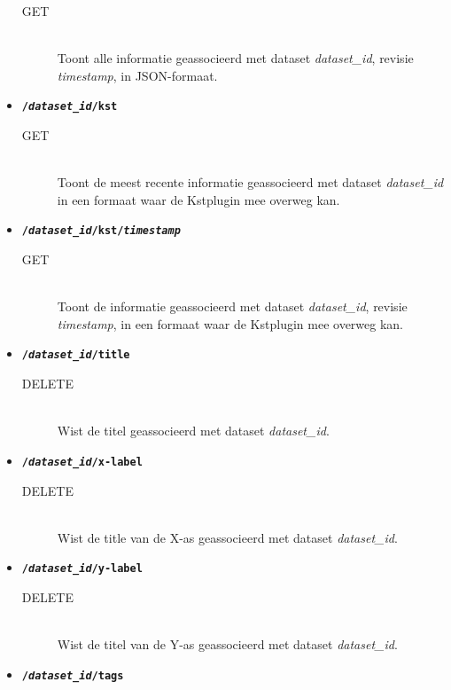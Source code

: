 \documentclass[a4paper]{article}
\begin{document}
\begin{itemize}
    \begin{description}
      \item[GET] \hfill \\
        Toont alle informatie geassocieerd met dataset {\it dataset\_id},
        revisie {\it timestamp}, in JSON-formaat.
    \end{description}
  \item {\tt\large\bf /{\it dataset\_id}/kst}
    \begin{description}
      \item[GET] \hfill \\
        Toont de meest recente informatie geassocieerd met dataset
        {\it dataset\_id} in een formaat waar de Kstplugin mee overweg kan.
    \end{description}
  \item {\tt\large\bf /{\it dataset\_id}/kst/{\it timestamp}}
    \begin{description}
      \item[GET] \hfill \\
        Toont de informatie geassocieerd met dataset {\it dataset\_id},
        revisie {\it timestamp}, in een formaat waar de Kstplugin mee overweg
        kan.
    \end{description}
  \item {\tt\large\bf /{\it dataset\_id}/title}
    \begin{description}
      \item[DELETE] \hfill \\
        Wist de titel geassocieerd met dataset {\it dataset\_id}.
    \end{description}
  \item {\tt\large\bf /{\it dataset\_id}/x-label}
    \begin{description}
      \item[DELETE] \hfill \\
        Wist de title van de X-as geassocieerd met dataset {\it dataset\_id}.
    \end{description}
  \item {\tt\large\bf /{\it dataset\_id}/y-label}
    \begin{description}
      \item[DELETE] \hfill \\
        Wist de titel van de Y-as geassocieerd met dataset {\it dataset\_id}.
    \end{description}
  \item {\tt\large\bf /{\it dataset\_id}/tags}

\end{itemize}
\end{document}
